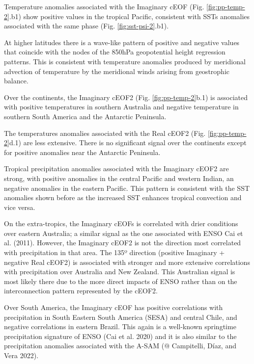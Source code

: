 \documentclass[smallextended]{svjour3}       %
\begin{document}
Temperature anomalies associated with the Imaginary cEOF (Fig. \ref{fig:pp-temp-2}.b1) show positive values in the tropical Pacific, consistent with SSTs anomalies associated with the same phase (Fig. \ref{fig:sst-psi-2}.b1).

At higher latitudes there is a wave-like pattern of positive and negative values that coincide with the nodes of the 850hPa geopotential height regression patterns.
This is consistent with temperature anomalies produced by meridional advection of temperature by the meridional winds arising from geostrophic balance.

Over the continents, the Imaginary cEOF2 (Fig. \ref{fig:pp-temp-2}b.1) is associated with positive temperatures in southern Australia and negative temperature in southern South America and the Antarctic Peninsula.

The temperatures anomalies associated with the Real cEOF2 (Fig. \ref{fig:pp-temp-2}d.1) are less extensive.
There is no significant signal over the continents except for positive anomalies near the Antarctic Peninsula.

Tropical precipitation anomalies associated with the Imaginary cEOF2 are strong, with positive anomalies in the central Pacific and western Indian, an negative anomalies in the eastern Pacific.
This pattern is consistent with the SST anomalies shown before as the increased SST enhances tropical convection and vice versa.

On the extra-tropics, the Imaginary cEOFs is correlated with drier conditions over eastern Australia; a similar signal as the one associated with ENSO Cai et al. (2011).
However, the Imaginary cEOF2 is not the direction most correlated with precipitation in that area.
The 135º direction (positive Imaginary + negative Real cEOF2) is associated with stronger and more extensive correlations with precipitation over Australia and New Zealand.
This Australian signal is most likely there due to the more direct impacts of ENSO rather than on the interconnection pattern represented by the cEOF2.



Over South America, the Imaginary cEOF has positive correlations with precipitation in South Eastern South America (SESA) and central Chile, and negative correlations in eastern Brazil. This again is a well-known springtime precipitation signature of ENSO (Cai et al. 2020) and it is also similar to the precipitation anomalies associated with the A-SAM (@ Campitelli, Díaz, and Vera 2022).
\end{document}
